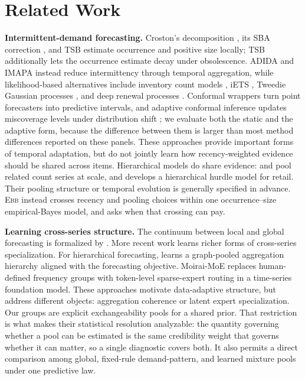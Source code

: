 \documentclass[twocolumn,10pt]{article}
\theoremstyle{definition}
\newcommand{\EBB}{\textsc{Ebb}}
\begin{document}
\section{Related Work}\label{sec:related}

\textbf{Intermittent-demand forecasting.} Croston's decomposition
\citep{croston1972}, its SBA correction \citep{syntetos2005accuracy}, and
TSB \citep{teunter2011} estimate occurrence and positive size locally;
TSB additionally lets the occurrence estimate decay under obsolescence.
ADIDA \citep{nikolopoulos2011} and IMAPA \citep{kourentzes2016} instead
reduce intermittency through temporal aggregation, while likelihood-based
alternatives include inventory count models \citep{snyder2012}, iETS
\citep{svetunkov2023iets}, Tweedie Gaussian processes \citep{damato2025},
and deep renewal processes \citep{turkmen2019}. Conformal wrappers turn
point forecasters into predictive intervals, and adaptive conformal
inference updates miscoverage levels under distribution shift
\citep{gibbs2021}; we evaluate both the static and the adaptive form,
because the difference between them is larger than most method
differences reported on these panels. These approaches provide important
forms of temporal adaptation, but do not jointly learn how
recency-weighted evidence should be shared across items. Hierarchical
models do share evidence: \citet{chapados2014} and \citet{seeger2016}
pool related count series at scale, and \citet{pitkin2024} develops a
hierarchical hurdle model for retail. Their pooling structure or temporal
evolution is generally specified in advance. \EBB{} instead crosses
recency and pooling choices within one occurrence--size empirical-Bayes
model, and asks when that crossing can pay.

\textbf{Learning cross-series structure.} The continuum between local and
global forecasting is formalized by \citet{monteromanso2021}. More recent
work learns richer forms of cross-series specialization. For hierarchical
forecasting, \citet{cini2024} learns a graph-pooled aggregation hierarchy
aligned with the forecasting objective. Moirai-MoE \citep{liu2025moirai}
replaces human-defined frequency groups with token-level sparse-expert
routing in a time-series foundation model. These approaches motivate
data-adaptive structure, but address different objects: aggregation
coherence or latent expert specialization. Our groups are explicit
exchangeability pools for a shared prior. That restriction is what makes
their statistical resolution analyzable: the quantity governing whether a
pool can be estimated is the same credibility weight that governs whether
it can matter, so a single diagnostic covers both. It also permits a
direct comparison among global, fixed-rule demand-pattern, and learned
mixture pools under one predictive law.
\end{document}
